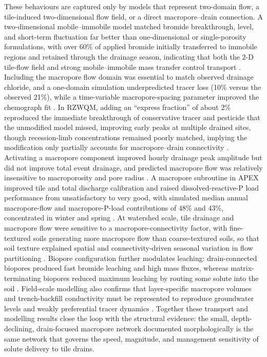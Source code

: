 \documentclass[11pt]{article}
\begin{document}
These behaviours are captured only by models that represent two-domain flow, a
tile-induced two-dimensional flow field, or a direct macropore--drain connection. A
two-dimensional mobile--immobile model matched bromide breakthrough, level, and
short-term fluctuation far better than one-dimensional or single-porosity
formulations, with over 60\% of applied bromide initially transferred to immobile
regions and retained through the drainage season, indicating that both the 2-D
tile-flow field and strong mobile--immobile mass transfer control transport
\parencite{Köhne2006}. Including the macropore flow domain was essential to match
observed drainage chloride, and a one-domain simulation underpredicted tracer loss
(10\% versus the observed 21\%), while a time-variable macropore-spacing parameter
improved the chemograph fit \parencite{Villholth1998b}. In RZWQM, adding an
``express fraction'' of about 2\% reproduced the immediate breakthrough of conservative
tracer and pesticide that the unmodified model missed, improving early peaks at
multiple drained sites, though recession-limb concentrations remained poorly matched,
implying the modification only partially accounts for macropore--drain connectivity
\parencite{Fox2004,Fox2007b}. Activating a macropore component improved hourly drainage
peak amplitude but did not improve total event drainage, and predicted macropore flow
was relatively insensitive to macroporosity and pore radius \parencite{Li2023d}. A
macropore subroutine in APEX improved tile and total discharge calibration and raised
dissolved-reactive-P load performance from unsatisfactory to very good, with simulated
median annual macropore-flow and macropore-P-load contributions of 48\% and 43\%,
concentrated in winter and spring \parencite{Ford2017}. At watershed scale, tile
drainage and macropore flow were sensitive to a macropore-connectivity factor, with
fine-textured soils generating more macropore flow than coarse-textured soils, so that
soil texture explained spatial and connectivity-driven seasonal variation in flow
partitioning \parencite{Poon2021}. Biopore configuration further modulates leaching:
drain-connected biopores produced fast bromide leaching and high mass fluxes, whereas
matrix-terminating biopores reduced maximum leaching by routing some solute into the
soil \parencite{Holbak2021}. Field-scale modelling also confirms that layer-specific
macropore volumes and trench-backfill conductivity must be represented to reproduce
groundwater levels and weakly preferential tracer dynamics
\parencite{AURA1995,Bechtold2007}. Together these transport and modelling results
close the loop with the structural evidence: the small, depth-declining, drain-focused
macropore network documented morphologically is the same network that governs the
speed, magnitude, and management sensitivity of solute delivery to tile drains.

\printbibliography
\end{document}
